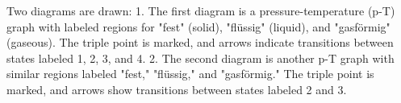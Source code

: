 Two diagrams are drawn:  
1. The first diagram is a pressure-temperature (p-T) graph with labeled regions for "fest" (solid), "flüssig" (liquid), and "gasförmig" (gaseous). The triple point is marked, and arrows indicate transitions between states labeled 1, 2, 3, and 4.  
2. The second diagram is another p-T graph with similar regions labeled "fest," "flüssig," and "gasförmig." The triple point is marked, and arrows show transitions between states labeled 2 and 3.
